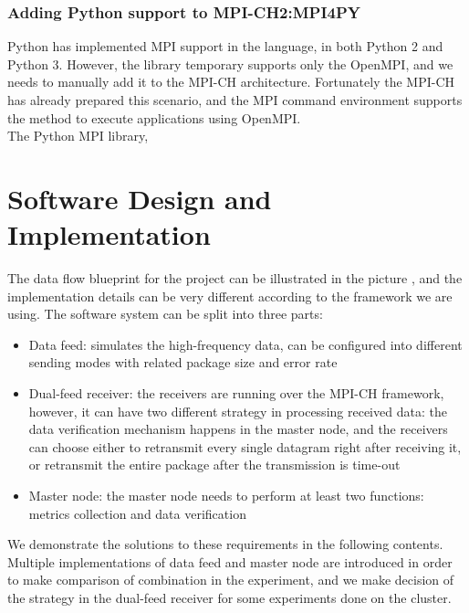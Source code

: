 \documentclass[11pt,openright,a4paper]{report}
\begin{document}
\subsubsection{Adding Python support to MPI-CH2:MPI4PY}
Python has implemented MPI support in the language, in both Python 2 and Python 3\cite{mpi4py}. However, the library temporary supports only the OpenMPI, and we needs to manually add it to the MPI-CH architecture. Fortunately the MPI-CH has already prepared this scenario, and the MPI command environment supports the method  to execute applications using OpenMPI.\\
The Python MPI library, 
\section{Software Design and Implementation}
The data flow blueprint for the project can be illustrated in the picture \cite{fig:LogicDesign}, and the implementation details can be very different according to the framework we are using. The software system can be split into three parts:
\begin{itemize}
	\item Data feed: simulates the high-frequency data, can be configured into different sending modes with related package size and error rate
	\item Dual-feed receiver: the receivers are running over the MPI-CH framework, however, it can have two different strategy in processing received data: the data verification mechanism happens in the master node, and the receivers can choose either to retransmit every single datagram right after receiving it, or retransmit the entire package after the transmission is time-out
	\item Master node: the master node needs to perform at least two functions: metrics collection and data verification
\end{itemize}
We demonstrate the solutions to these requirements in the following contents. Multiple implementations of data feed and master node are introduced in order to make comparison of combination in the experiment, and we make decision of the strategy in the dual-feed receiver for some experiments done on the cluster. 
\end{document}
